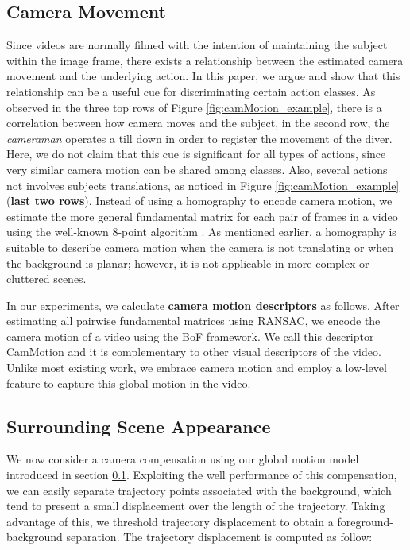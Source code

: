 \subsection{Camera Movement}
\label{subsec:cam_motion}
Since videos are normally filmed with the intention of maintaining the subject within the image frame, there exists a relationship between the estimated camera movement and the underlying action. In this paper, we argue and show that this relationship can be a useful cue for discriminating certain action classes. As observed in the three top rows of Figure \ref{fig:camMotion_example}, there is a correlation between how camera moves and the subject, \eg in the second row, the \textit{cameraman} operates a till down in order to register the movement of the diver. Here, we do not claim that this cue is significant for all types of actions, since very similar camera motion can be shared among classes. Also, several actions not involves subjects translations, as noticed in Figure \ref{fig:camMotion_example} (\textbf{last two rows}). Instead of using a homography to encode camera motion, we estimate the more general fundamental matrix for each pair of frames in a video using the well-known 8-point algorithm \cite{eightpoint97}. As mentioned earlier, a homography is suitable to describe camera motion when the camera is not translating or when the background is planar; however, it is not applicable in more complex or cluttered scenes.

In our experiments, we calculate \textbf{camera motion descriptors} as follows. After estimating all pairwise fundamental matrices using RANSAC, we encode the camera motion of a video using the BoF framework. We call this descriptor CamMotion and it is complementary to other visual descriptors of the video. Unlike most existing work, we embrace camera motion and employ a low-level feature to capture this global motion in the video.



\subsection{Surrounding Scene Appearance}
We now consider a camera compensation using our global motion model introduced in section \ref{subsec:cam_motion}. Exploiting the well performance of this compensation, we can easily separate trajectory points associated with the background, which tend to present a small displacement over the length of the trajectory. Taking advantage of this, we threshold trajectory displacement to obtain a foreground-background separation. The trajectory displacement is computed as follow:


